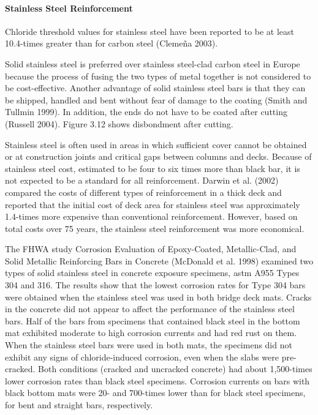 \paragraph{Stainless Steel Reinforcement}
Chloride threshold values for stainless steel have been reported to be at least 10.4-times greater than for carbon
steel (Clemeña 2003).

Solid stainless steel is preferred over stainless steel-clad carbon steel in Europe because the process of fusing the
two types of metal together is not considered to be cost-effective. Another advantage of solid stainless steel bars is
that they can be shipped, handled and bent without fear of damage to the coating (Smith and Tullmin 1999). In
addition, the ends do not have to be coated after cutting (Russell 2004). Figure 3.12 shows disbondment after
cutting.

Stainless steel is often used in areas in which sufficient cover cannot be obtained or at construction joints and
critical gaps between columns and decks. Because of stainless steel cost, estimated to be four to six times more than
black bar, it is not expected to be a standard for all reinforcement. Darwin et al. (2002) compared the costs of
different types of reinforcement in a thick deck and reported that the initial cost of deck area for stainless steel was
approximately 1.4-times more expensive than conventional reinforcement. However, based on total costs over 75
years, the stainless steel reinforcement was more economical.

The FHWA study Corrosion Evaluation of Epoxy-Coated, Metallic-Clad, and Solid Metallic Reinforcing Bars in
Concrete (McDonald et al. 1998) examined two types of solid stainless steel in concrete exposure specimens, \acrshort*{astm}
A955 Types 304 and 316. The results show that the lowest corrosion rates for Type 304 bars were obtained when the stainless steel was used in both bridge deck mats. Cracks in the concrete did not appear to affect the performance of
the stainless steel bars. Half of the bars from specimens that contained black steel in the bottom mat exhibited
moderate to high corrosion currents and had red rust on them. When the stainless steel bars were used in both mats,
the specimens did not exhibit any signs of chloride-induced corrosion, even when the slabs were pre-cracked. Both
conditions (cracked and uncracked concrete) had about 1,500-times lower corrosion rates than black steel specimens.
Corrosion currents on bars with black bottom mats were 20- and 700-times lower than for black steel specimens, for
bent and straight bars, respectively.

